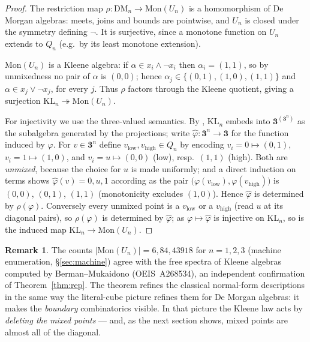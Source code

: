 \documentclass[11pt]{amsart}
\theoremstyle{definition}
\newtheorem{rem}[thm]{Remark}
\newcommand{\DM}{\mathrm{DM}}
\newcommand{\KL}{\mathrm{KL}}
\newcommand{\lc}{Q}
\newcommand{\uc}{U}
\newcommand{\Kthree}{\mathbf{3}}
\begin{document}
\begin{proof}
  The restriction map
  $\rho : \DM_n \to \mathrm{Mon}(\uc_n)$ is a homomorphism of De
  Morgan algebras: meets, joins and bounds are pointwise, and
  $\uc_n$ is closed under the symmetry defining $\neg$.  It is
  surjective, since a monotone function on $\uc_n$ extends to
  $\lc_n$ (e.g.\ by its least monotone extension).

  $\mathrm{Mon}(\uc_n)$ is a Kleene algebra: if
  $\alpha \in x_i \wedge \neg x_i$ then $\alpha_i = (1,1)$, so by
  unmixedness no pair of $\alpha$ is $(0,0)$; hence
  $\alpha_j \in \{(0,1), (1,0), (1,1)\}$ and
  $\alpha \in x_j \vee \neg x_j$, for every $j$.  Thus $\rho$
  factors through the Kleene quotient, giving a surjection
  $\KL_n \twoheadrightarrow \mathrm{Mon}(\uc_n)$.

  For injectivity we use the three-valued semantics.  By
  \cite{GWW}, $\KL_n$ embeds into $\Kthree^{(\Kthree^n)}$ as the
  subalgebra generated by the projections; write
  $\hat\varphi : \Kthree^n \to \Kthree$ for the function induced by
  $\varphi$.  For $v \in \Kthree^n$ define
  $v_{\mathrm{low}}, v_{\mathrm{high}} \in \lc_n$ by encoding
  $v_i = 0 \mapsto (0,1)$, $v_i = 1 \mapsto (1,0)$, and
  $v_i = u \mapsto (0,0)$ (low), resp.\ $(1,1)$ (high).  Both are
  \emph{unmixed}, because the choice for $u$ is made uniformly; and
  a direct induction on terms shows
  $\hat\varphi(v) = 0, u, 1$ according as the pair
  $\bigl(\varphi(v_{\mathrm{low}}), \varphi(v_{\mathrm{high}})\bigr)$
  is $(0,0)$, $(0,1)$, $(1,1)$ (monotonicity excludes $(1,0)$).
  Hence $\hat\varphi$ is determined by $\rho(\varphi)$.
  Conversely every unmixed point is a $v_{\mathrm{low}}$ or a
  $v_{\mathrm{high}}$ (read $u$ at its diagonal pairs), so
  $\rho(\varphi)$ is determined by $\hat\varphi$; as
  $\varphi \mapsto \hat\varphi$ is injective on $\KL_n$, so is the
  induced map $\KL_n \to \mathrm{Mon}(\uc_n)$.
\end{proof}

\begin{rem}
  The counts $|\mathrm{Mon}(\uc_n)| = 6, 84, 43918$ for
  $n = 1, 2, 3$ (machine enumeration, \S\ref{sec:machine}) agree
  with the free spectra of Kleene algebras computed by
  Berman--Mukaidono \cite{BermanMukaidono} (OEIS~A268534), an
  independent confirmation of Theorem~\ref{thm:rep}.  The theorem
  refines the classical normal-form descriptions \cite{GWW,
  BermanMukaidono} in the same way the literal-cube picture refines
  them for De Morgan algebras: it makes the \emph{boundary}
  combinatorics visible.  In that picture the Kleene law acts by
  \emph{deleting the mixed points} --- and, as the next section
  shows, mixed points are almost all of the diagonal.
\end{rem}
\end{document}
